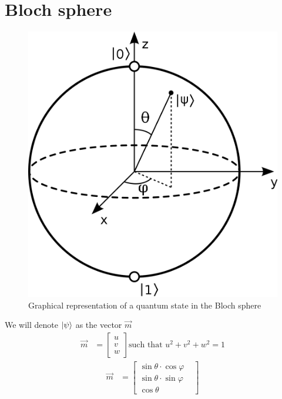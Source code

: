 \documentclass{article}
\begin{document}
\section{Bloch sphere}
\begin{figure}[h]
    \centering
    \includegraphics[scale=0.15]{bloch-sphere.png}
    \caption{Graphical representation of a quantum state in the Bloch sphere}
\end{figure}
\noindent
We will denote $\ket{\psi}$ as the vector $\vec{m}$
\begin{equation}
    \begin{aligned}
        \vec{m} & = \begin{bmatrix}
            u \\ v \\ w
        \end{bmatrix} \text{such that } u^2 + v^2 + w^2 = 1
    \end{aligned}
\end{equation}
\begin{equation}
    \begin{aligned}
        \vec{m} & =
        \begin{bmatrix}
            \label{def-vect-m}
            \sin \theta \cdot \cos \varphi \\
            \sin \theta \cdot \sin \varphi \\
            \cos \theta &
        \end{bmatrix}
    \end{aligned}
\end{equation}
\end{document}

